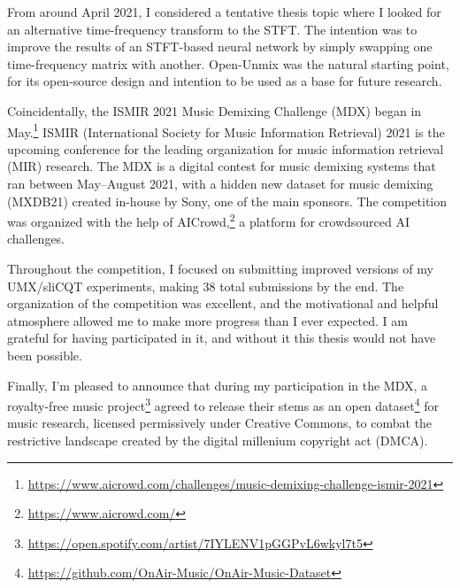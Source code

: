 \documentclass[report.tex]{subfiles}
\begin{document}
From around April 2021, I considered a tentative thesis topic where I looked for an alternative time-frequency transform to the STFT. The intention was to improve the results of an STFT-based neural network by simply swapping one time-frequency matrix with another. Open-Unmix was the natural starting point, for its open-source design and intention to be used as a base for future research.

Coincidentally, the ISMIR 2021 Music Demixing Challenge (MDX) began in May.\footnote{\url{https://www.aicrowd.com/challenges/music-demixing-challenge-ismir-2021}}  ISMIR (International Society for Music Information Retrieval) 2021 is the upcoming conference for the leading organization for music information retrieval (MIR) research. The MDX is a digital contest for music demixing systems that ran between May--August 2021, with a hidden new dataset for music demixing (MXDB21) created in-house by Sony, one of the main sponsors. The competition was organized with the help of AICrowd,\footnote{\url{https://www.aicrowd.com/}} a platform for crowdsourced AI challenges.

Throughout the competition, I focused on submitting improved versions of my UMX/sliCQT experiments, making 38 total submissions by the end. The organization of the competition was excellent, and the motivational and helpful atmosphere allowed me to make more progress than I ever expected. I am grateful for having participated in it, and without it this thesis would not have been possible.

Finally, I'm pleased to announce that during my participation in the MDX, a royalty-free music project\footnote{\url{https://open.spotify.com/artist/7IYLENV1pGGPvL6wkyl7t5}} agreed to release their stems as an open dataset\footnote{\url{https://github.com/OnAir-Music/OnAir-Music-Dataset}} for music research, licensed permissively under Creative Commons, to combat the restrictive landscape created by the digital millenium copyright act (DMCA).
\end{document}
